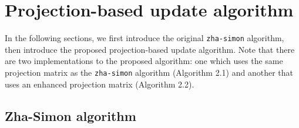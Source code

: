 \section{Projection-based update algorithm} \label{sec:alg}

In the following sections, we first introduce the original \verb|zha-simon| algorithm, then introduce the proposed projection-based update algorithm. Note that there are two implementations to the proposed algorithm: one which uses the same projection matrix as the \verb|zha-simon| algorithm (Algorithm 2.1) and another that uses an enhanced projection matrix (Algorithm 2.2).

\subsection{Zha-Simon algorithm}


